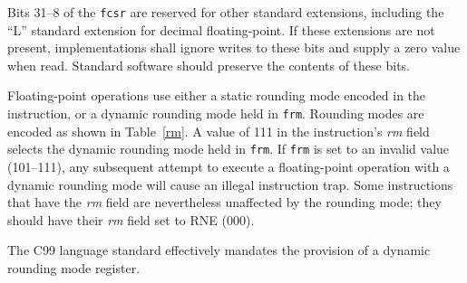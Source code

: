 Bits 31--8 of the {\tt fcsr} are reserved for other standard extensions,
including the ``L'' standard extension for decimal floating-point.  If
these extensions are not present, implementations shall ignore writes to
these bits and supply a zero value when read.  Standard software should
preserve the contents of these bits.

Floating-point operations use either a static rounding mode encoded in the
instruction, or a dynamic rounding mode held in {\tt frm}.  Rounding modes are
encoded as shown in Table~\ref{rm}.  A value of 111 in the instruction's {\em
rm} field selects the dynamic rounding mode held in {\tt frm}.  If {\tt frm}
is set to an invalid value (101--111), any subsequent attempt to execute
a floating-point operation with a dynamic rounding mode will cause an illegal
instruction trap.  Some instructions that have the {\em rm} field are
nevertheless unaffected by the rounding mode; they should have their {\em rm}
field set to RNE (000).

\begin{commentary}
The C99 language standard effectively mandates the provision of a
dynamic rounding mode register.
\end{commentary}
\newpage
 
